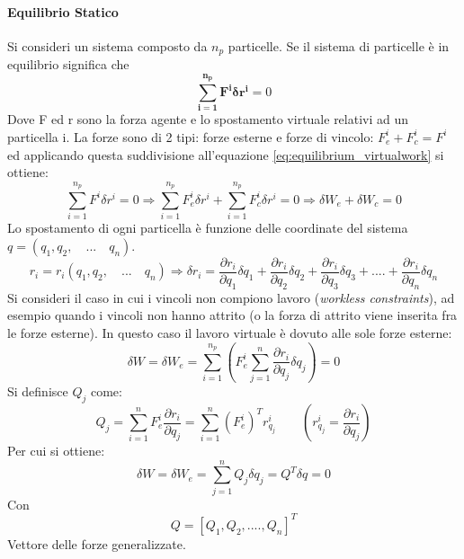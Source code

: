 \paragraph{Equilibrio Statico}
Si consideri un sistema composto da $n_p$ particelle. Se il sistema di particelle è in equilibrio significa che 
\begin{equation}
\label{eq:equilibrium_virtualwork}
\mathbf{ \sum_{i=1}^{n_p} F^i \delta r^i }=  0
\end{equation}
Dove F ed r sono la forza agente e lo spostamento virtuale relativi ad un particella i. La forze sono di 2 tipi: forze esterne e forze di vincolo: 
$F^i_e +F^i_c = F^i$ ed applicando questa suddivisione all'equazione \ref{eq:equilibrium_virtualwork} si ottiene:
\[\sum_{i=1}^{n_p}F^i\delta r^i = 0 \Rightarrow \sum_{i=1}^{n_p}F_e^i\delta r^i + \sum_{i=1}^{n_p}F_c^i\delta r^i = 0 \Rightarrow \delta W_e + \delta W_c = 0 \]
Lo spostamento di ogni particella è funzione delle coordinate del sistema $q= (q_1, q_2,\quad ... \quad q_n)$.
\[r_i = r_i(q_1, q_2,\quad ... \quad q_n) \Rightarrow \delta r_i = 
\frac{\partial r_i}{\partial q_1}\delta q_1 + \frac{\partial r_i}{\partial q_2}\delta q_2 + \frac{\partial r_i}{\partial q_3}\delta q_3 + .... + \frac{\partial r_i}{\partial q_n}\delta q_n \]
Si consideri il caso in cui i vincoli non compiono lavoro (\emph{workless constraints}), ad esempio quando i vincoli non hanno attrito (o la forza di attrito viene inserita fra le forze esterne). In questo caso il lavoro virtuale è dovuto alle sole forze esterne: \begin{equation}
\delta W = \delta W _e = 
\sum_{i=1}^{n_p}\left( F_e^i \sum_{j=1}^n \frac{\partial r_i}{\partial q_j}\delta q_j \right) = 0
\end{equation}
Si definisce $Q_j$ come: \begin{equation}
Q_j = \sum_{i=1}^n F_e^i \frac{\partial r_i}{\partial q_j} = \sum_{i=1}^n \left(F_e^i\right)^T r^i_{q_j} \qquad \left( r^i_{q_j}=\frac{\partial r_i}{\partial q_j} \right)
\end{equation}
Per cui si ottiene: \begin{equation}
\delta W = \delta W_e = \sum_{j=1}^n Q_j\delta q_j = Q^T \delta q = 0
\end{equation}
Con \begin{equation}
Q = \left[Q_1, Q_2 , .... , Q_n\right]^T
\end{equation}
Vettore delle forze generalizzate.

